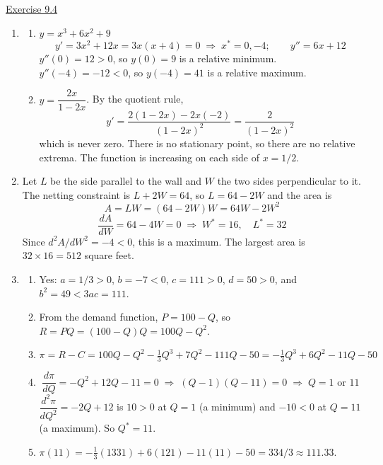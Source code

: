 \underline{Exercise 9.4}
\begin{enumerate}
\item[1.]
\begin{enumerate}
\item[(b)] $y = x^{3} + 6x^{2} + 9$
\[y' = 3x^{2} + 12x = 3x(x + 4) = 0 \;\Rightarrow\; x^{*} = 0, -4; \qquad y'' = 6x + 12\]
$y''(0) = 12 > 0$, so $y(0) = 9$ is a relative minimum. $y''(-4) = -12 < 0$, so $y(-4) = 41$ is a relative maximum.
\item[(d)] $y = \dfrac{2x}{1 - 2x}$. By the quotient rule,
\[y' = \frac{2(1 - 2x) - 2x(-2)}{(1 - 2x)^{2}} = \frac{2}{(1 - 2x)^{2}}\]
which is never zero. There is no stationary point, so there are no relative extrema. The function is increasing on each side of $x = 1/2$.
\end{enumerate}

\item[2.] Let $L$ be the side parallel to the wall and $W$ the two sides perpendicular to it. The netting constraint is $L + 2W = 64$, so $L = 64 - 2W$ and the area is
\[A = LW = (64 - 2W)W = 64W - 2W^{2}\]
\[\frac{dA}{dW} = 64 - 4W = 0 \;\Rightarrow\; W^{*} = 16, \quad L^{*} = 32\]
Since $d^{2}A/dW^{2} = -4 < 0$, this is a maximum. The largest area is $32 \times 16 = 512$ square feet.

\item[3.]
\begin{enumerate}
\item[(a)] Yes: $a = 1/3 > 0$, $b = -7 < 0$, $c = 111 > 0$, $d = 50 > 0$, and $b^{2} = 49 < 3ac = 111$.
\item[(b)] From the demand function, $P = 100 - Q$, so $R = PQ = (100 - Q)Q = 100Q - Q^{2}$.
\item[(c)] $\pi = R - C = 100Q - Q^{2} - \tfrac{1}{3}Q^{3} + 7Q^{2} - 111Q - 50 = -\tfrac{1}{3}Q^{3} + 6Q^{2} - 11Q - 50$
\item[(d)]
\[\frac{d\pi}{dQ} = -Q^{2} + 12Q - 11 = 0 \;\Rightarrow\; (Q - 1)(Q - 11) = 0 \;\Rightarrow\; Q = 1 \text{ or } 11\]
$\dfrac{d^{2}\pi}{dQ^{2}} = -2Q + 12$ is $10 > 0$ at $Q = 1$ (a minimum) and $-10 < 0$ at $Q = 11$ (a maximum). So $Q^{*} = 11$.
\item[(e)] $\pi(11) = -\tfrac{1}{3}(1331) + 6(121) - 11(11) - 50 = 334/3 \approx 111.33$.
\end{enumerate}

\end{enumerate}
